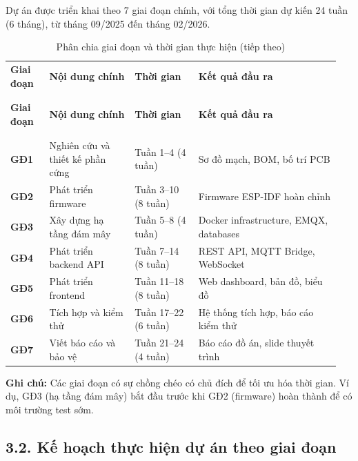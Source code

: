 \documentclass[a4paper]{extarticle}
\newcommand{\thesissettableid}[2]{%
  \renewcommand{\thetable}{#1}%
  \renewcommand{\theHtable}{#2}%
}
\begin{document}
Dự án được triển khai theo 7 giai đoạn chính, với tổng thời gian dự kiến
24 tuần (6 tháng), từ tháng 09/2025 đến tháng 02/2026.


{\thesissettableid{PL-3.1}{tab-app3-phan-chia-giai-oan-va-thoi-gian-thuc-hien}
\def\LTcaptype{table}
\begin{longtable}{|L{0.115\linewidth}|L{0.247\linewidth}|L{0.184\linewidth}|L{0.408\linewidth}|}
\caption{Phân chia giai đoạn và thời gian thực hiện}\label{tab:app3-phan-chia-giai-oan-va-thoi-gian-thuc-hien}\\
\hline \textbf{Giai đoạn} & \textbf{Nội dung chính} & \textbf{Thời gian} & \textbf{Kết quả đầu ra} \\
\\\hline
\endfirsthead
\caption[]{Phân chia giai đoạn và thời gian thực hiện (tiếp theo)}\\
\hline \textbf{Giai đoạn} & \textbf{Nội dung chính} & \textbf{Thời gian} & \textbf{Kết quả đầu ra} \\
\\\hline
\endhead
\\\hline
\endfoot
\endlastfoot
\textbf{GĐ1} & Nghiên cứu và thiết kế phần cứng & Tuần 1--4 (4 tuần) &
Sơ đồ mạch, BOM, bố trí PCB \\\hline
\textbf{GĐ2} & Phát triển firmware & Tuần 3--10 (8 tuần) & Firmware
ESP-IDF hoàn chỉnh \\\hline
\textbf{GĐ3} & Xây dựng hạ tầng đám mây & Tuần 5--8 (4 tuần) & Docker
infrastructure, EMQX, databases \\\hline
\textbf{GĐ4} & Phát triển backend API & Tuần 7--14 (8 tuần) & REST API,
MQTT Bridge, WebSocket \\\hline
\textbf{GĐ5} & Phát triển frontend & Tuần 11--18 (8 tuần) & Web
dashboard, bản đồ, biểu đồ \\\hline
\textbf{GĐ6} & Tích hợp và kiểm thử & Tuần 17--22 (6 tuần) & Hệ thống
tích hợp, báo cáo kiểm thử \\\hline
\textbf{GĐ7} & Viết báo cáo và bảo vệ & Tuần 21--24 (4 tuần) & Báo cáo
đồ án, slide thuyết trình \\\hline
\end{longtable}
}


\textbf{Ghi chú:} Các giai đoạn có sự chồng chéo có chủ đích
để tối ưu hóa thời gian. Ví dụ, GĐ3 (hạ tầng đám mây) bắt đầu trước khi
GĐ2 (firmware) hoàn thành để có môi trường test sớm.

\subsection{3.2. Kế hoạch thực hiện dự án theo giai đoạn}\label{32-kux1ebf-houx1ea1ch-thux1ef1c-hiux1ec7n-dux1ef1-uxe1n-theo-giai-ux111oux1ea1n}
\end{document}
